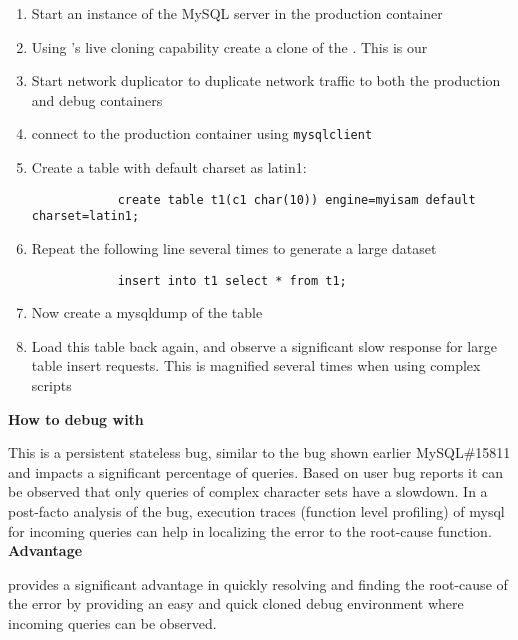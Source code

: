 \begin{adjustwidth}{0.5cm}{}
	\begin{enumerate}
		\item Start an instance of the MySQL server in the production container
		\item Using \parikshan's live cloning capability create a clone of the \productioncontainer. This is our \debugcontainer
		\item Start network duplicator to duplicate network traffic to both the production and debug containers
		\item connect to the production container using \texttt{mysqlclient}
		\item Create a table with default charset as latin1:
			
			\begin{lstlisting}
			create table t1(c1 char(10)) engine=myisam default charset=latin1;
			\end{lstlisting}
			
		\item Repeat the following line several times to generate a large dataset
		
			\begin{lstlisting}
			insert into t1 select * from t1;
			\end{lstlisting}
	
		\item Now create a mysqldump of the table
		\item Load this table back again, and observe a significant slow response for large table insert requests. This is magnified several times when using complex scripts
	\end{enumerate}
\end{adjustwidth}

\noindent \textbf{How to debug with \parikshan}

This is a persistent stateless bug, similar to the bug shown earlier MySQL\#15811 and impacts a significant percentage of queries. Based on user bug reports it can be observed that only queries of complex character sets have a slowdown. In a post-facto analysis of the bug, execution traces (function level profiling) of mysql for incoming queries can help in localizing the error to the root-cause function.\\

\noindent \textbf{Advantage}

\parikshan provides a significant advantage in quickly resolving and finding the root-cause of the error by providing an easy and quick cloned debug environment where incoming queries can be observed. \\


